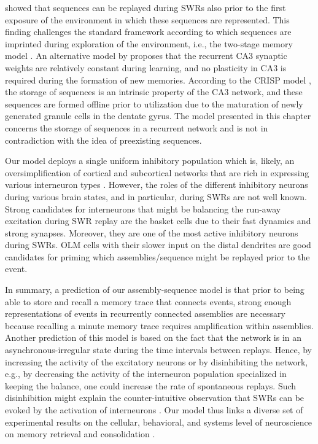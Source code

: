     \cite{Dragoi2011, Dragoi2013} showed that sequences can
    be replayed during SWRs also prior to the first exposure of the environment
    in which these sequences are represented. This finding challenges the
    standard framework according to which sequences are imprinted during
    exploration of the environment, i.e., the two-stage memory model
    \citep{Buzsaki1989}. An alternative model by
    \cite{ChengS2013} proposes that the recurrent CA3 synaptic weights are
    relatively constant during learning, and no plasticity in CA3 is required
    during the formation of new memories. According to the CRISP model
    \citep{ChengS2013}, the storage of sequences is an intrinsic property of the
    CA3 network, and these sequences are formed offline prior to utilization
    due to the maturation of newly generated granule cells in the dentate
    gyrus. The model presented in this chapter concerns the storage of
    sequences in a recurrent network and is not in contradiction with the idea
    of preexisting sequences.

    Our model deploys a single uniform inhibitory population which is, likely,
    an oversimplification of cortical and subcortical networks that are rich in
    expressing various interneuron types \citep{Klausberger2008, Kullmann2011}.
    However, the roles of the different inhibitory neurons during various brain
    states, and in particular, during SWRs are not well known. Strong
    candidates for interneurons that might be balancing the run-away excitation
    during SWR replay are the basket cells due to their fast dynamics and
    strong synapses. Moreover, they are one of the most active inhibitory
    neurons during SWRs. OLM cells with their slower input on the distal
    dendrites are good candidates for priming which assemblies/sequence might
    be replayed prior to the event.

    In summary, a prediction of our assembly-sequence model is that prior to
    being able to store and recall a memory trace that connects events, strong
    enough representations of events in recurrently connected assemblies are
    necessary because recalling a minute memory trace requires amplification
    within assemblies. Another prediction of this model is based on the fact
    that the network is in an asynchronous-irregular state during the time
    intervals between replays. Hence, by increasing the activity of the
    excitatory neurons or by disinhibiting the network, e.g., by decreasing the
    activity of the interneuron population specialized in keeping the balance,
    one could increase the rate of spontaneous replays. Such disinhibition
    might explain the counter-intuitive observation that SWRs can be evoked by
    the activation of interneurons \citep{Ellender2010, Schlingloff2014}. Our
    model thus links a diverse set of experimental results on the cellular,
    behavioral, and systems level of neuroscience on memory retrieval and
    consolidation \citep{Diekelmann2010}.

